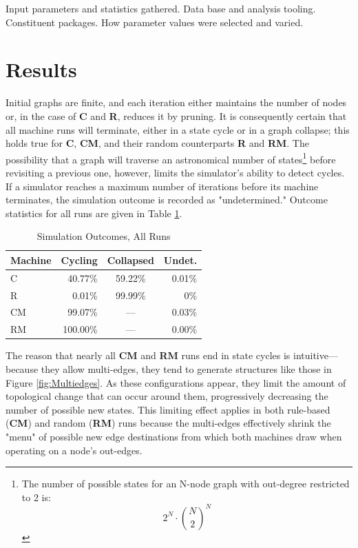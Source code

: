 \documentclass{tufte-handout}
\begin{document}
Input parameters and statistics gathered. Data base and analysis tooling.
Constituent packages. How parameter values were selected and varied.


\section{Results}

Initial graphs are finite, and each iteration
either maintains the number of nodes or, in the case of \textbf{C} and \textbf{R},
reduces it by pruning.  It is consequently certain that all machine runs will terminate,
either in a state cycle or in a graph collapse; this holds true
for \textbf{C}, \textbf{CM}, and their random counterparts \textbf{R} and \textbf{RM}.
The possibility that a graph will traverse an astronomical number
of states\footnote{The number of possible states for an N-node graph with
out-degree restricted to 2 is:
\[
2^N\cdot\binom{N}{2}^N
\]
}
before revisiting a previous one, however, limits the simulator's ability to
detect cycles. If a simulator reaches a maximum number of iterations
before its machine terminates, the simulation outcome is recorded as "undetermined."
Outcome statistics for all runs are given in Table \ref{tab:Tab1}.

\begin{table}
\caption{Simulation Outcomes, All Runs}
\centering
\begin{tabular}{lrcr}
\toprule
Machine & Cycling & Collapsed & Undet. \\
\midrule
C & 40.77\% & 59.22\% & 0.01\% \\
R & 0.01\% & 99.99\% & 0\% \\
\cmidrule(r){2-3}
CM & 99.07\% & --- & 0.03\% \\
RM & 100.00\% & --- & 0.00\% \\
\bottomrule
\end{tabular}
\label{tab:Tab1}
\end{table}
\vspace{3mm}
The reason that nearly all \textbf{CM} and \textbf{RM} runs end in state cycles is
intuitive---because they allow multi-edges, they tend to generate structures
like those in Figure \ref{fig:Multiedges}. As these configurations appear, they limit the
amount of topological change that can occur around them, progressively decreasing the
number of possible new states. This limiting effect
applies in both rule-based (\textbf{CM}) and random (\textbf{RM}) runs because
the multi-edges effectively shrink the "menu" of possible new edge destinations from
which both machines draw when operating on a node's out-edges.
\end{document}
